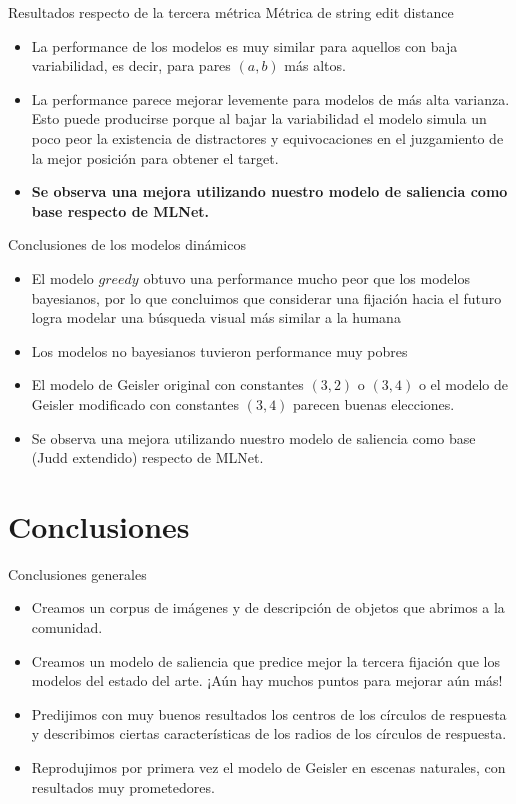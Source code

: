 \documentclass[compress]{beamer}
\begin{document}
\begin{frame}{Resultados respecto de la tercera métrica}
{Métrica de string edit distance}
\begin{itemize}
\item La performance de los modelos es muy similar para aquellos con baja variabilidad, es decir, para pares $(a, b)$ más altos. \item La performance parece mejorar levemente para modelos de más alta varianza. Esto puede producirse porque al bajar la variabilidad el modelo simula un poco peor la existencia
de distractores y equivocaciones en el juzgamiento de la mejor posición para obtener el target.
\item \textbf{Se observa una mejora utilizando nuestro modelo de saliencia como base respecto de MLNet.}
\end{itemize}
\end{frame}

\begin{frame}{Conclusiones de los modelos dinámicos}
\begin{itemize}
\item El modelo $greedy$ obtuvo una performance mucho peor que los modelos bayesianos, por lo que concluimos que considerar una fijación hacia el futuro logra modelar una búsqueda visual más similar a la humana
\item Los modelos no bayesianos tuvieron performance muy pobres
\item El modelo de Geisler original con constantes $(3,2)$ o $(3,4)$ o el modelo de Geisler modificado con constantes $(3,4)$ parecen buenas elecciones.
\item Se observa una mejora utilizando nuestro modelo de saliencia como base (Judd extendido) respecto de MLNet.
\end{itemize}
\end{frame}

\section{Conclusiones}
\begin{frame}{Conclusiones generales}
\begin{itemize}
\item Creamos un corpus de imágenes y de descripción de objetos que abrimos a la comunidad.
\item Creamos un modelo de saliencia que predice mejor la tercera fijación que los modelos del estado del arte. ¡Aún hay muchos puntos para mejorar aún más!
\item Predijimos con muy buenos resultados los centros de los círculos de respuesta y describimos ciertas características de los radios de los círculos de respuesta.
\item Reprodujimos por primera vez el modelo de Geisler en escenas naturales, con resultados muy prometedores.
\end{itemize}
\end{frame}
\end{document}

